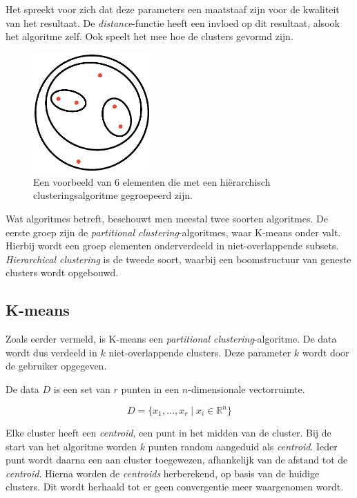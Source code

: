 Het spreekt voor zich dat deze parameters een maatstaaf zijn voor de kwaliteit van het resultaat. De \emph{distance}-functie heeft een invloed op dit resultaat, alsook het algoritme zelf. Ook speelt het mee hoe de clusters gevormd zijn.
%
\begin{figure}[h]
\centering
\caption{Een voorbeeld van 6 elementen die met een hi\"erarchisch clusteringsalgoritme gegroepeerd zijn. }
\label{figure:hierarchical_clustering}
\includegraphics[width=0.40\textwidth]{res/ch4_hierarchical_clustering.eps}
\end{figure}
%
Wat algoritmes betreft, beschouwt men meestal twee soorten algoritmes. De eerste groep zijn de \emph{partitional clustering}-algoritmes, waar K-means onder valt. Hierbij wordt een groep elementen onderverdeeld in niet-overlappende subsets. \emph{Hierarchical clustering} is de tweede soort, waarbij een boomstructuur van geneste clusters wordt opgebouwd.  
%
\subsection{K-means}
Zoals eerder vermeld, is K-means een \emph{partitional clustering}-algoritme. De data wordt dus verdeeld in $k$ niet-overlappende clusters. Deze parameter $k$ wordt door de gebruiker opgegeven.

De data $D$ is een set van $r$ punten in een $n$-dimensionale vectorruimte. 

\begin{equation}
D= \{x_1, \dots, x_r \mid x_i \in \mathds{R}^n\}
\end{equation}

Elke cluster heeft een \emph{centroid}, een punt in het midden van de cluster. Bij de start van het algoritme worden $k$ punten random aangeduid als \emph{centroid}. Ieder punt wordt daarna een aan cluster toegewezen, afhankelijk van de afstand tot de \emph{centroid}. Hierna worden de \emph{centroids} herberekend, op basis van de huidige clusters. Dit wordt herhaald tot er geen convergentie meer waargenomen wordt. 

